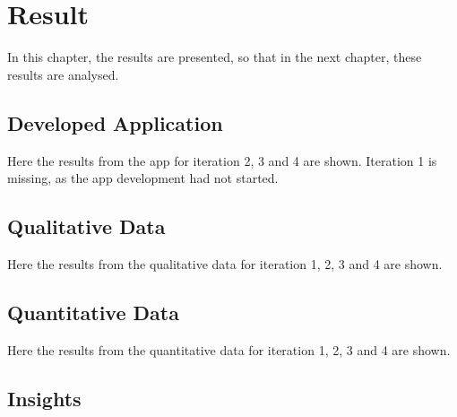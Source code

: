 \chapter{Result}\label{cha:Research}
%


In this chapter, the results are presented, so that in the next chapter, these results are analysed.

%

\section{Developed Application}

  Here the results from the app for iteration 2, 3 and 4 are shown. Iteration 1 is missing, as the app development had not started.

  
  
  
  

\section{Qualitative Data}

  Here the results from the qualitative data for iteration 1, 2, 3 and 4 are shown.

  
  
  
  

\section{Quantitative Data}

  Here the results from the quantitative data for iteration 1, 2, 3 and 4 are shown.

  
  
  
  

\section{Insights}

  
  
  
  


%

